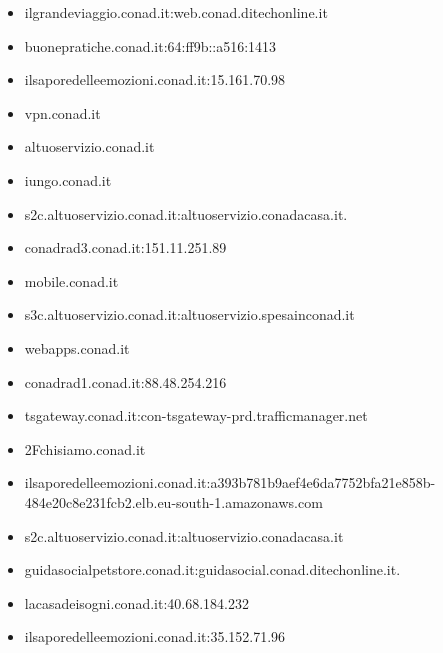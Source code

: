 \documentclass{article}
\begin{document}
\begin{itemize}
        \item ilgrandeviaggio.conad.it:web.conad.ditechonline.it
    
        \item buonepratiche.conad.it:64:ff9b::a516:1413
    
        \item ilsaporedelleemozioni.conad.it:15.161.70.98
    
        \item vpn.conad.it
    
        \item altuoservizio.conad.it
    
        \item iungo.conad.it
    
        \item s2c.altuoservizio.conad.it:altuoservizio.conadacasa.it.
    
        \item conadrad3.conad.it:151.11.251.89
    
        \item mobile.conad.it
    
        \item s3c.altuoservizio.conad.it:altuoservizio.spesainconad.it
    
        \item webapps.conad.it
    
        \item conadrad1.conad.it:88.48.254.216
    
        \item tsgateway.conad.it:con-tsgateway-prd.trafficmanager.net
    
        \item 2Fchisiamo.conad.it
    
        \item ilsaporedelleemozioni.conad.it:a393b781b9aef4e6da7752bfa21e858b-484e20c8e231fcb2.elb.eu-south-1.amazonaws.com
    
        \item s2c.altuoservizio.conad.it:altuoservizio.conadacasa.it
    
        \item guidasocialpetstore.conad.it:guidasocial.conad.ditechonline.it.
    
        \item lacasadeisogni.conad.it:40.68.184.232
    
        \item ilsaporedelleemozioni.conad.it:35.152.71.96
    

\end{itemize}
\end{document}
